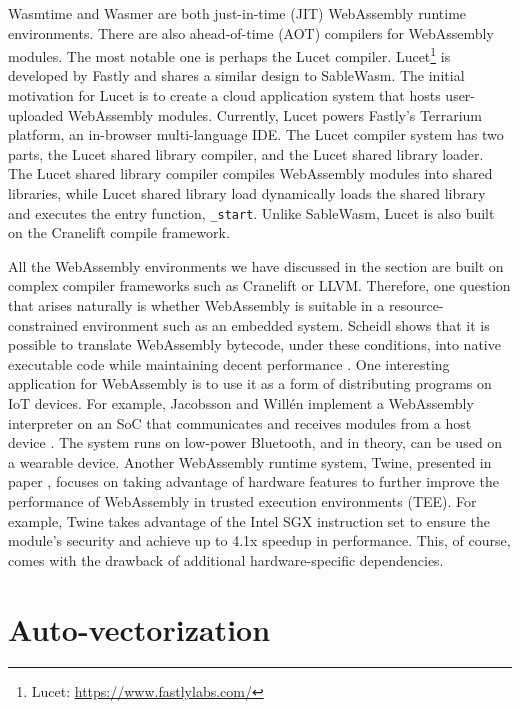 Wasmtime and Wasmer are both just-in-time (JIT) WebAssembly runtime
environments. There are also ahead-of-time (AOT) compilers for WebAssembly
modules. The most notable one is perhaps the Lucet compiler.
Lucet\footnote{Lucet: \url{https://www.fastlylabs.com/}} is developed by
Fastly and shares a similar design to SableWasm. The initial motivation for
Lucet is to create a cloud application system that hosts user-uploaded
WebAssembly modules. Currently, Lucet powers Fastly's Terrarium platform,
an in-browser multi-language IDE. The Lucet compiler system has two parts,
the Lucet shared library compiler, and the Lucet shared library loader.
The Lucet shared library compiler compiles WebAssembly modules into shared
libraries, while Lucet shared library load dynamically loads the shared
library and executes the entry function, \texttt{\_start}. Unlike SableWasm,
Lucet is also built on the Cranelift compile framework.

All the WebAssembly environments we have discussed in the section are built
on complex compiler frameworks such as Cranelift or LLVM. Therefore, one
question that arises naturally is whether WebAssembly is suitable in a
resource-constrained environment such as an embedded system. Scheidl shows that
it is possible to translate WebAssembly bytecode, under these conditions, into
native executable code while maintaining decent performance
\cite{webassembly-embedded}. One interesting application for WebAssembly is to
use it as a form of distributing programs on IoT devices. For example,
Jacobsson and Willén implement a WebAssembly interpreter on an SoC that
communicates and receives modules from a host device
\cite{webassembly-wearables}. The system runs on low-power Bluetooth, and in
theory, can be used on a wearable device. Another WebAssembly runtime system,
Twine, presented in paper \cite{webassembly-sgx}, focuses on taking advantage
of hardware features to further improve the performance of WebAssembly in
trusted execution environments (TEE). For example, Twine takes advantage of the
Intel SGX instruction set to ensure the module's security and achieve up to
4.1x speedup in performance. This, of course, comes with the drawback of
additional hardware-specific dependencies.

\section*{Auto-vectorization}

